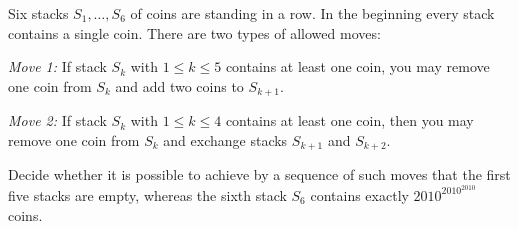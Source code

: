 Six stacks $S_1, \ldots, S_6$ of coins are standing in a row. In the beginning every stack contains a single coin. There are two types of allowed moves:

\emph{Move 1:} If stack $S_k$ with $1 \leq k \leq 5$ contains at least one coin, you may remove one coin from $S_k$ and add two coins to $S_{k+1}$.

\emph{Move 2:} If stack $S_k$ with $1 \leq k \leq 4$ contains at least one coin, then you may remove one coin from $S_k$ and exchange stacks $S_{k+1}$ and $S_{k+2}$.

Decide whether it is possible to achieve by a sequence of such moves that the first five stacks are empty, whereas the sixth stack $S_6$ contains exactly $2010^{2010^{2010}}$ coins.
